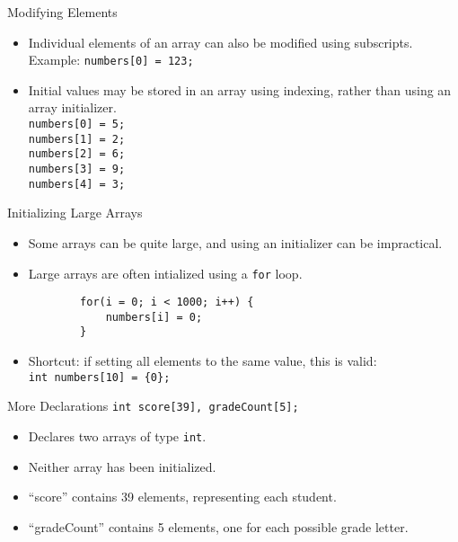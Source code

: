 \documentclass[graphics]{beamer}
\begin{document}
\begin{frame}{Modifying Elements}
    \begin{itemize}
        \item Individual elements of an array can also be modified using subscripts. Example: \texttt{numbers[0] = 123;}
        \item Initial values may be stored in an array using indexing, rather than using an array initializer. \\
        \texttt{numbers[0] = 5;} \\
        \texttt{numbers[1] = 2;} \\
        \texttt{numbers[2] = 6;} \\
        \texttt{numbers[3] = 9;} \\
        \texttt{numbers[4] = 3;} \\
    \end{itemize}
\end{frame}

\begin{frame}[fragile]{Initializing Large Arrays}
    \begin{itemize}
        \item Some arrays can be quite large, and using an initializer can be impractical.
        \item Large arrays are often intialized using a \texttt{for} loop.
        \begin{verbatim}
        for(i = 0; i < 1000; i++) {
            numbers[i] = 0;
        }
        \end{verbatim}
        \item Shortcut: if setting all elements to the same value, this is valid: \\
        \texttt{int numbers[10] = \{0\};}
    \end{itemize}
\end{frame}

\begin{frame}{More Declarations}
    \texttt{int score[39], gradeCount[5];}
    \begin{itemize}
        \item Declares two arrays of type \texttt{int}.
        \item Neither array has been initialized.
        \item ``score'' contains 39 elements, representing each student.
        \item ``gradeCount'' contains 5 elements, one for each possible grade letter.
    \end{itemize}
\end{frame}
\end{document}
